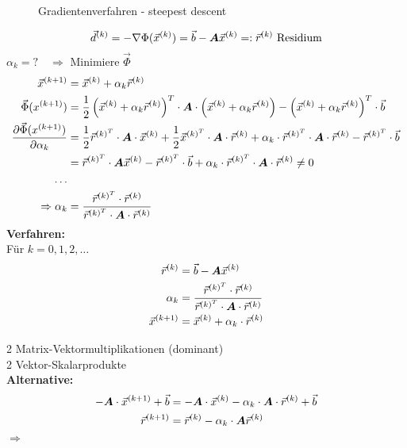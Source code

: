 \begin{figure}
	\center
	
	\caption{Gradientenverfahren - steepest descent}
	\label{fig:steepest-descent}
\end{figure}

\begin{align}
	\vec{d}^{(k)} &= - \nabla \Phi(\vec{x}^{(k)}) = \vec{b} - \boldsymbol {A} \vec{x}^{(k)} =: \vec{r}^{(k)} \text{ Residium}\\
\end{align}
$\alpha_k = ? \quad \Rightarrow $ Minimiere $ \vec{\Phi}$\\
\begin{align}
	\vec{x}^{(k+1)} &= \vec{x}^{(k)} + \alpha_k \vec{r}^{(k)}\\
	\vec{\Phi}(x^{(k+1)}) &= \frac{1}{2} \left( \vec{x}^{(k)} + \alpha_k \vec{r}^{(k)}\right)^T \cdot \boldsymbol {A} \cdot \left( \vec{x}^{(k)} + \alpha_k \vec{r}^{(k)}\right) - \left( \vec{x}^{(k)} + \alpha_k \vec{r}^{(k)}\right)^T \cdot \vec{b}\\
	\frac{\partial \vec{\Phi}(x^{(k+1)})}{\partial \alpha_k} &= \frac{1}{2} \vec{r}^{{(k)}^T} \cdot \boldsymbol {A} \cdot \vec{x}^{(k)} + \frac{1}{2} \vec{x}^{{(k)}^T} \cdot \boldsymbol {A} \cdot \vec{r}^{(k)} + \alpha_k \cdot \vec{r}^{{(k)}^T} \cdot \boldsymbol {A} \cdot \vec{r}^{(k)} - \vec{r}^{{(k)}^T} \cdot \vec{b}\\
	&= \vec{r}^{{(k)}^T} \cdot \boldsymbol {A} \vec{x}^{(k)} - \vec{r}^{{(k)}^T} \cdot \vec{b} + \alpha_k \cdot \vec{r}^{{(k)}^T} \cdot \boldsymbol {A} \cdot \vec{r}^{(k)} \neq 0\\
	\ldots\\
	\Rightarrow \alpha_k &= \frac{\vec{r}^{{(k)}^T} \cdot \vec{r}^{(k)}}{\vec{r}^{{(k)}^T} \cdot \boldsymbol {A} \cdot \vec{r}^{(k)}}
\end{align}
\textbf{Verfahren: }\\
Für $k = 0,1,2,\ldots$
\begin{align}
	\vec{r}^{(k)} &= \vec{b} - \boldsymbol {A} \vec{x}^{(k)}\\
	\alpha_k &= \frac{\vec{r}^{{(k)}^T} \cdot \vec{r}^{(k)}}{\vec{r}^{{(k)}^T} \cdot \boldsymbol {A} \cdot \vec{r}^{(k)}}\\
	\vec{x}^{(k+1)} &= \vec{x}^{(k)} + \alpha_k \cdot \vec{r}^{(k)} \label{eq:verfahren-schritt-3}
\end{align}

2 Matrix-Vektormultiplikationen (dominant)\\
2 Vektor-Skalarprodukte\\
\textbf{Alternative:}
\begin{align}
	- \boldsymbol {A} \cdot \vec{x}^{(k+1)} + \vec{b} &= - \boldsymbol {A} \cdot \vec{x}^{(k)} - \alpha_k \cdot \boldsymbol {A} \cdot \vec{r}^{(k)} + \vec{b}\\
	\vec{r}^{(k+1)} &= \vec{r}^{(k)} - \alpha_k \cdot \boldsymbol {A} \vec{r}^{(k)}
\end{align}
$\Rightarrow$ 

